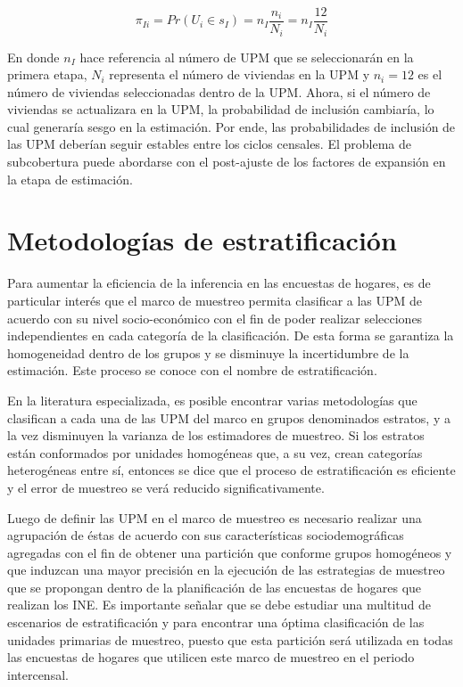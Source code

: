 \documentclass[
  12pt,
]{book}
\begin{document}
\[
\pi_{Ii}=Pr(U_i \in s_I)=n_I\frac{n_i}{N_i}=n_I\frac{12}{N_i}
\]

En donde \(n_I\) hace referencia al número de UPM que se seleccionarán en la primera etapa, \(N_i\) representa el número de viviendas en la UPM y \(n_i=12\) es el número de viviendas seleccionadas dentro de la UPM. Ahora, si el número de viviendas se actualizara en la UPM, la probabilidad de inclusión cambiaría, lo cual generaría sesgo en la estimación. Por ende, las probabilidades de inclusión de las UPM deberían seguir estables entre los ciclos censales. El problema de subcobertura puede abordarse con el post-ajuste de los factores de expansión en la etapa de estimación.

\hypertarget{metodologuxedas-de-estratificaciuxf3n}{%
\chapter{Metodologías de estratificación}\label{metodologuxedas-de-estratificaciuxf3n}}

Para aumentar la eficiencia de la inferencia en las encuestas de hogares, es de particular interés que el marco de muestreo permita clasificar a las UPM de acuerdo con su nivel socio-económico con el fin de poder realizar selecciones independientes en cada categoría de la clasificación. De esta forma se garantiza la homogeneidad dentro de los grupos y se disminuye la incertidumbre de la estimación. Este proceso se conoce con el nombre de estratificación.

En la literatura especializada, es posible encontrar varias metodologías que clasifican a cada una de las UPM del marco en grupos denominados estratos, y a la vez disminuyen la varianza de los estimadores de muestreo. Si los estratos están conformados por unidades homogéneas que, a su vez, crean categorías heterogéneas entre sí, entonces se dice que el proceso de estratificación es eficiente y el error de muestreo se verá reducido significativamente.

Luego de definir las UPM en el marco de muestreo es necesario realizar una agrupación de éstas de acuerdo con sus características sociodemográficas agregadas con el fin de obtener una partición que conforme grupos homogéneos y que induzcan una mayor precisión en la ejecución de las estrategias de muestreo que se propongan dentro de la planificación de las encuestas de hogares que realizan los INE. Es importante señalar que se debe estudiar una multitud de escenarios de estratificación y para encontrar una óptima clasificación de las unidades primarias de muestreo, puesto que esta partición será utilizada en todas las encuestas de hogares que utilicen este marco de muestreo en el periodo intercensal.
\end{document}
